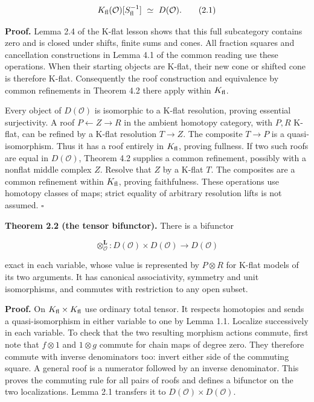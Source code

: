 \documentclass[
  english,
  11pt,
  a4paper,
]{article}
\begin{document}
\[K_{\rm fl}(\mathcal O)[S_{\rm fl}^{-1}]
\ \simeq\ D(\mathcal O).
\tag{2.1}\]

\textbf{Proof.} Lemma 2.4 of the K-flat lesson shows that this full
subcategory contains zero and is closed under shifts, finite sums and
cones. All fraction squares and cancellation constructions in Lemma 4.1
of the common reading use these operations. When their starting objects
are K-flat, their new cone or shifted cone is therefore K-flat.
Consequently the roof construction and equivalence by common refinements
in Theorem 4.2 there apply within \(K_{\rm fl}\).

Every object of \(D(\mathcal O)\) is isomorphic to a K-flat resolution,
proving essential surjectivity. A roof \(P\leftarrow Z\to R\) in the
ambient homotopy category, with \(P,R\) K-flat, can be refined by a
K-flat resolution \(T\to Z\). The composite \(T\to P\) is a
quasi-isomorphism. Thus it has a roof entirely in \(K_{\rm fl}\),
proving fullness. If two such roofs are equal in \(D(\mathcal O)\),
Theorem 4.2 supplies a common refinement, possibly with a nonflat middle
complex \(Z\). Resolve that \(Z\) by a K-flat \(T\). The composites are
a common refinement within \(K_{\rm fl}\), proving faithfulness. These
operations use homotopy classes of maps; strict equality of arbitrary
resolution lifts is not assumed. \(\square\)

\textbf{Theorem 2.2 (the tensor bifunctor).} There is a bifunctor

\[\otimes_{\mathcal O}^{\mathbf L}:
D(\mathcal O)\times D(\mathcal O)\longrightarrow D(\mathcal O)
\tag{2.2}\]

exact in each variable, whose value is represented by \(P\otimes R\) for
K-flat models of its two arguments. It has canonical associativity,
symmetry and unit isomorphisms, and commutes with restriction to any
open subset.

\textbf{Proof.} On \(K_{\rm fl}\times K_{\rm fl}\) use ordinary total
tensor. It respects homotopies and sends a quasi-isomorphism in either
variable to one by Lemma 1.1. Localize successively in each variable. To
check that the two resulting morphism actions commute, first note that
\(f\otimes1\) and \(1\otimes g\) commute for chain maps of degree zero.
They therefore commute with inverse denominators too: invert either side
of the commuting square. A general roof is a numerator followed by an
inverse denominator. This proves the commuting rule for all pairs of
roofs and defines a bifunctor on the two localizations. Lemma 2.1
transfers it to \(D(\mathcal O)\times D(\mathcal O)\).
\end{document}
